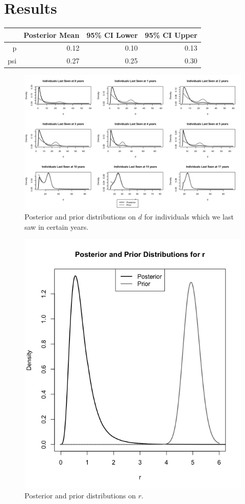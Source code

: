 \documentclass[12pt, a4paper]{article}
\begin{document}
\section{Results}

\begin{table}[ht]
\centering
\begin{tabular}{rrrr}
  \hline
   & Posterior Mean & 95\% CI Lower & 95\% CI Upper \\ 
  \hline
  p & 0.12 & 0.10 & 0.13 \\ 
  psi & 0.27 & 0.25 & 0.30 \\ 
   \hline
\end{tabular}
\end{table}

\begin{figure}
\centering
\includegraphics[width = \textwidth]{Posterior_d.png}
\caption{Posterior and prior distributions on $d$ for individuals which we last saw in certain years.}
\end{figure}

\begin{figure}
\centering
\includegraphics[width = .4\textwidth]{Posterior_r.png}
\caption{Posterior and prior distributions on $r$.}
\end{figure}
\end{document}
